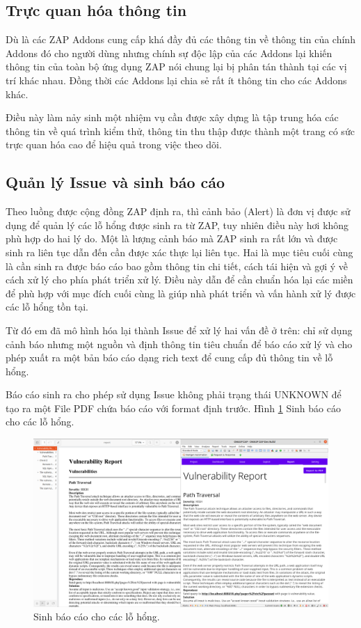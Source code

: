 \documentclass[./../main.tex]{subfiles}
\begin{document}
\subsection{Trực quan hóa thông tin}
Dù là các ZAP Addons cung cấp khá đầy đủ các thông tin về thông tin của chính Addons đó cho người dùng nhưng chính sự độc lập của các Addons lại khiến thông tin của toàn bộ ứng dụng ZAP nói chung lại bị phân tán thành tại các vị trí khác nhau. Đồng thời các Addons lại chia sẻ rất ít thông tin cho các Addons khác.

Điều này làm nảy sinh một nhiệm vụ cần được xây dựng là tập trung hóa các thông tin về quá trình kiểm thử, thông tin thu thập được thành một trang có sức trực quan hóa cao để hiệu quả trong việc theo dõi.
\subsection{Quản lý Issue và sinh báo cáo}
Theo luồng được cộng đồng ZAP định ra, thì cảnh bảo (Alert) là đơn vị được sử dụng để quản lý các lỗ hổng được sinh ra từ ZAP, tuy nhiên điều này hơi không phù hợp do hai lý do. Một là lượng cảnh báo mà ZAP sinh ra rất lớn và được sinh ra liên tục dẫn đến cần được xác thực lại liên tục. Hai là mục tiêu cuối cùng là cần sinh ra được báo cáo bao gồm thông tin chi tiết, cách tái hiện và gợi ý về cách xử lý cho phía phát triển xử lý. Điều này dẫn để cần chuẩn hóa lại các miền để phù hợp với mục đích cuối cùng là giúp nhà phát triển và vấn hành xử lý được các lỗ hổng tồn tại.

Từ đó em đã mô hình hóa lại thành Issue để xử lý hai vấn đề ở trên: chỉ sử dụng cảnh báo nhưng một nguồn và định thông tin tiêu chuẩn để báo cáo xử lý và cho phép xuất ra một bản báo cáo dạng rich text để cung cấp đủ thông tin về lỗ hổng.

Báo cáo sinh ra cho phép sử dụng Issue không phải trạng thái UNKNOWN để tạo ra một File PDF chứa báo cáo với format định trước.
Hình \ref{fig:report} Sinh báo cáo cho các lỗ hổng.

\begin{figure}[h!]
	\includegraphics[width=\linewidth]{./images/report.png}
	\caption{Sinh báo cáo cho các lỗ hổng.}
	\label{fig:report}
\end{figure}
\end{document}
